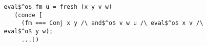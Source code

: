 \begin{figure}[!t]
  \centering
  \begin{minipage}{0.75\textwidth}
    \begin{lstlisting}[frame=tb]
 eval$^o$ fm u = fresh (x y v w)
   (conde [
     (fm === Conj x y /\ and$^o$ v w u /\ eval$^o$ x v /\ eval$^o$ y w);
     ...])
    \end{lstlisting}
  \end{minipage}
\end{figure}
